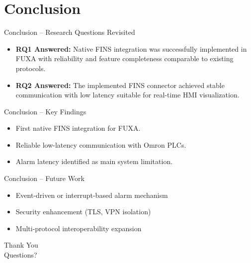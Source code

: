\documentclass[aspectratio=169]{beamer}
\begin{document}
\section{Conclusion}

\begin{frame}{Conclusion -- Research Questions Revisited}
\begin{itemize}
  \item \textbf{RQ1 Answered:}  
  Native FINS integration was successfully implemented in FUXA with reliability and feature completeness comparable to existing protocols.

  \vspace{0.2cm}
  \item \textbf{RQ2 Answered:}  
  The implemented FINS connector achieved stable communication with low latency suitable for real-time HMI visualization.

  \end{itemize}
\end{frame}


\begin{frame}{Conclusion -- Key Findings}
\begin{itemize}
  \item First native FINS integration for FUXA.
  \item Reliable low-latency communication with Omron PLCs.
  \item Alarm latency identified as main system limitation.
\end{itemize}
\end{frame}

\begin{frame}{Conclusion -- Future Work}
\begin{itemize}
  \item Event-driven or interrupt-based alarm mechanism
  \item Security enhancement (TLS, VPN isolation)
  \item Multi-protocol interoperability expansion
\end{itemize}
\end{frame}

\begin{frame}
\centering
\Huge Thank You\\[0.5cm]
\Large Questions?
\end{frame}
\end{document}
